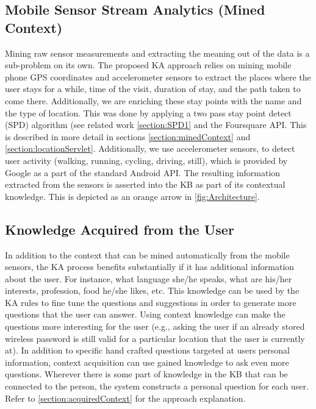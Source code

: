 \subsection{Mobile Sensor Stream Analytics (Mined Context)} 
\label{section:bg:contextu}
Mining raw sensor measurements and extracting the meaning out of the data is a 
sub-problem on its own. The proposed KA approach relies on mining mobile phone 
GPS coordinates and accelerometer sensors to extract the places where the user 
stays for a while, time of the visit, duration of stay, and the path taken to 
come there. Additionally, we are enriching these stay points with the name and 
the type of location. This was done by applying a two pass stay point detect
(SPD) algorithm (see related work \autoref{section:SPD1} and the Foursquare API. 
This is described in more detail in sections \ref{section:minedContext} and
\ref{section:locationServlet}. Additionally, we use accelerometer sensors, 
to detect user activity (walking, running, cycling, driving, still), which is 
provided by Google as a part of the standard Android API. The resulting 
information extracted from the sensors is asserted into the KB as part of its 
contextual knowledge. This is depicted as an orange arrow in 
\autoref{fig:Architecture}.

\subsection{Knowledge Acquired from the User}
\label{section:bg:contextm}
In addition to the context that can be mined automatically from the mobile 
sensors, the KA process benefits substantially if it has additional information
about the user. For instance, what language she/he speaks, what are his/her 
interests, profession, food he/she likes, etc. This knowledge can be used by 
the KA rules to fine tune the questions and suggestions in order to generate 
more questions that the user can answer. Using context knowledge can make 
the questions more interesting for the user (e.g., asking the user if an 
already stored wireless password is still valid for a particular location that 
the user is currently at). In addition to specific hand crafted questions 
targeted at users personal information, context acquisition can use gained 
knowledge to ask even more questions. Wherever there is some part of knowledge 
in the KB that can be connected to the person, the system constructs a 
personal question for each user. Refer to \autoref{section:acquiredContext} for
the approach explanation.

